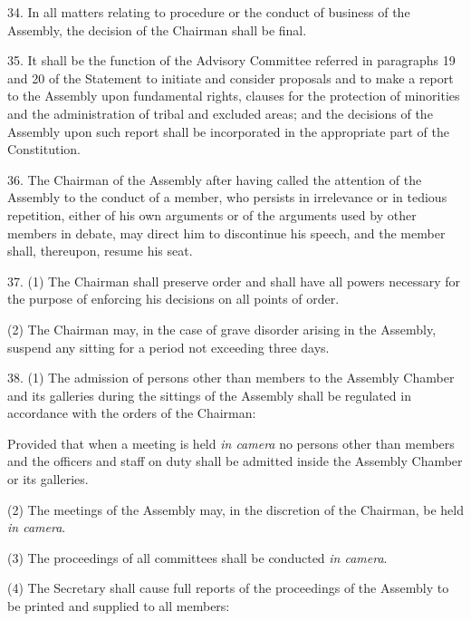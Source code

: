 34. In all matters relating to procedure or the conduct of business of the Assembly, the decision of the Chairman shall be final.



35. It shall be the function of the Advisory Committee referred in paragraphs 19 and 20 of the Statement to initiate and consider proposals and to make a report to the Assembly upon fundamental rights, clauses for the protection of minorities and the administration of tribal and excluded areas; and the decisions of the Assembly upon such report shall be incorporated in the appropriate part of the Constitution.



36. The Chairman of the Assembly after having called the attention of the Assembly to the conduct of a member, who persists in irrelevance or in tedious repetition, either of his own arguments or of the arguments used by other members in debate, may direct him to discontinue his speech, and the member shall, thereupon, resume his seat.



37. (1) The Chairman shall preserve order and shall have all powers necessary for the purpose of enforcing his decisions on all points of order.



(2) The Chairman may, in the case of grave disorder arising in the Assembly, suspend any sitting for a period not exceeding three days.



38. (1) The admission of persons other than members to the Assembly Chamber and its galleries during the sittings of the Assembly shall be regulated in accordance with the orders of the Chairman:



Provided that when a meeting is held \emph{in camera} no persons other than members and the officers and staff on duty shall be admitted inside the Assembly Chamber or its galleries.



(2) The meetings of the Assembly may, in the discretion of the Chairman, be held \emph{in camera}.



(3) The proceedings of all committees shall be conducted \emph{in camera}.



(4) The Secretary shall cause full reports of the proceedings of the Assembly to be printed and supplied to all members:



